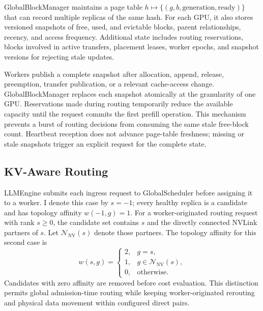 \documentclass{article}
\begin{document}
GlobalBlockManager maintains a page table $h \mapsto \{(g,b,\mathrm{generation},\mathrm{ready})\}$ that can record multiple replicas of the same hash. For each GPU, it also stores versioned snapshots of free, used, and evictable blocks, parent relationships, recency, and access frequency. Additional state includes routing reservations, blocks involved in active transfers, placement leases, worker epochs, and snapshot versions for rejecting stale updates.

Workers publish a complete snapshot after allocation, append, release, preemption, transfer publication, or a relevant cache-access change. GlobalBlockManager replaces each snapshot atomically at the granularity of one GPU. Reservations made during routing temporarily reduce the available capacity until the request commits the first prefill operation. This mechanism prevents a burst of routing decisions from consuming the same stale free-block count. Heartbeat reception does not advance page-table freshness; missing or stale snapshots trigger an explicit request for the complete state.

\subsection{KV-Aware Routing}
\label{sec:routing}

LLMEngine submits each ingress request to GlobalScheduler before assigning it to a worker. I denote this case by $s=-1$; every healthy replica is a candidate and has topology affinity $w(-1,g)=1$. For a worker-originated routing request with rank $s\geq0$, the candidate set contains $s$ and the directly connected NVLink partners of $s$. Let $\mathcal{N}_{\mathrm{NV}}(s)$ denote those partners. The topology affinity for this second case is
\begin{equation}
 w(s,g)=
 \begin{cases}
 2, & g=s,\\
 1, & g\in\mathcal{N}_{\mathrm{NV}}(s),\\
 0, & \text{otherwise}.
 \end{cases}
\end{equation}
Candidates with zero affinity are removed before cost evaluation. This distinction permits global admission-time routing while keeping worker-originated rerouting and physical data movement within configured direct pairs.
\end{document}
